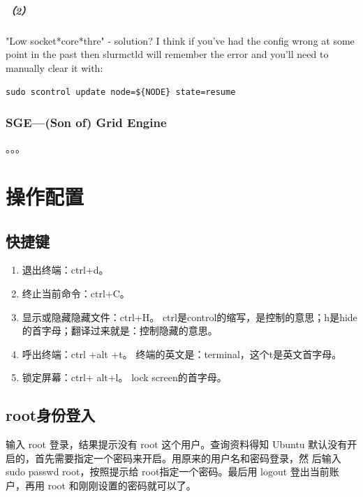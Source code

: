 {\paragraph{（2）}
"Low socket*core*thre" - solution?
I think if you've had the config wrong at some point in the past then slurmctld 
will remember the error and you'll need to manually clear it with:

\verb|sudo scontrol update node=${NODE} state=resume|



\subsection{SGE—(Son of) Grid Engine}
。。。







\chapter{操作配置}
\section{快捷键}
\begin{enumerate}
\item 退出终端：ctrl+d。

\item 终止当前命令：ctrl+C。

\item 显示或隐藏隐藏文件：ctrl+H。 ctrl是control的缩写，是控制的意思；h是hide的首字母；翻译过来就是：控制隐藏的意思。

\item 呼出终端：ctrl +alt +t。 终端的英文是：terminal，这个t是英文首字母。

\item 锁定屏幕：ctrl+ alt+l。 lock screen的首字母。
\end{enumerate}



\section{root身份登入}
输入 root 登录，结果提示没有 root 这个用户。查询资料得知 Ubuntu 默认没有开启的，首先需要指定一个密码来开启。用原来的用户名和密码登录，然 后输入sudo passwd root，按照提示给 root指定一个密码。最后用 logout 登出当前账户，再用 root 和刚刚设置的密码就可以了。

}

